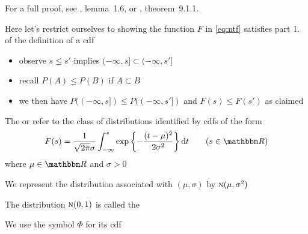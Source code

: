 \begin{frame}

    \vspace{2em}
    For a full proof, see \cite{williams1991probability}, lemma~1.6,
    or \cite{dudley2002real}, theorem~9.1.1.
    
    Here let's restrict ourselves to showing the function $F$ in
    \eqref{eq:ntf} satisfies part 1. of the definition of a {\sc cdf}
    
    \begin{itemize}
        \item observe 
    $s \leq s'$ implies $(-\infty, s] \subset (-\infty, s']$
        \item recall $P(A)\leq P(B)$ if $A\subset B$ 
        \item we then have $P((-\infty, s]) \leq P((-\infty, s'])$
        and $F(s) \leq F(s')$ as claimed
    \end{itemize}
 
\end{frame}

\begin{frame}

    \vspace{2em}
    \Eg
    The  or  refer to the class of distributions identified by {\sc
    cdf}s
    of the form
    \begin{equation*}
        F(s) =
        \frac{1}{\sqrt{2 \pi} \sigma}
        \int_{-\infty}^s
           \exp \left\{ - 
               \frac{(t - \mu)^2}{2\sigma^2} \right\} \diff t
       \qquad (s \in \RR)
    \end{equation*}
    where $\mu \in \RR$ and $\sigma > 0$
    
    We represent the distribution
    associated with $(\mu, \sigma)$ by $\textrm{\sc n}(\mu, \sigma^2)$
    
    The distribution
    $\textrm{\sc n}(0, 1)$ is called the 
    
    We use the symbol $\Phi$ for its {\sc cdf}
    
\end{frame}

